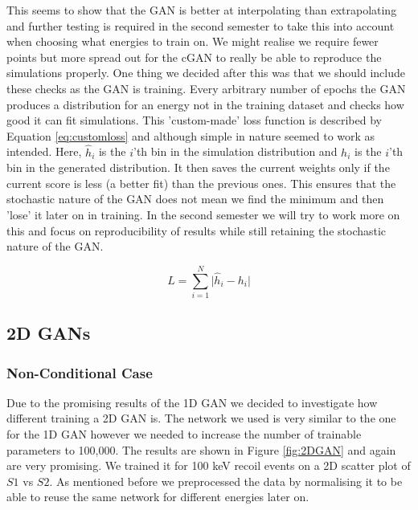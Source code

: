 \documentclass[11pt]{article} %
\begin{document}
This seems to show that the GAN is better at interpolating than extrapolating and further testing is required in the second semester to take this into account when choosing what energies to train on. We might realise we require fewer points but more spread out for the cGAN to really be able to reproduce the simulations properly. One thing we decided after this was that we should include these checks as the GAN is training. Every arbitrary number of epochs the GAN produces a distribution for an energy not in the training dataset and checks how good it can fit simulations. This 'custom-made' loss function is described by Equation \ref{eq:customloss} and although simple in nature seemed to work as intended. Here, $\hat{h}_i$ is the $i$'th bin in the simulation distribution and ${h_i}$ is the $i$'th bin in the generated distribution. It then saves the current weights only if the current score is less (a better fit) than the previous ones. This ensures that the stochastic nature of the GAN does not mean we find the minimum and then 'lose' it later on in training. In the second semester we will try to work more on this and focus on reproducibility of results while still retaining the stochastic nature of the GAN.

\begin{equation}
L = \sum_{i=1}^{N}{\lvert{\hat{h}_i}-{h_i}\rvert}
\label{eq:customloss}
\end{equation}

\subsection{2D GANs}
\subsubsection{Non-Conditional Case}
Due to the promising results of the 1D GAN we decided to investigate how different training a 2D GAN is. The network we used is very similar to the one for the 1D GAN however we needed to increase the number of trainable parameters to 100,000. The results are shown in Figure \ref{fig:2DGAN} and again are very promising. We trained it for 100 keV recoil events on a 2D scatter plot of $S1$ vs $S2$. As mentioned before we preprocessed the data by normalising it to be able to reuse the same network for different energies later on.
\end{document}
